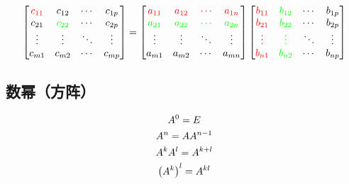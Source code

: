 \documentclass{article}
\begin{document}
\[\begin{bmatrix}
        \textcolor{red}{c_{11}} & c_{12}                    & \cdots & c_{1p} \\
        c_{21}                  & \textcolor{green}{c_{22}} & \cdots & c_{2p} \\
        \vdots                  & \vdots                    & \ddots & \vdots \\
        c_{m1}                  & c_{m2}                    & \cdots & c_{mp} \\
    \end{bmatrix}=
    \begin{bmatrix}
        \textcolor{red}{a_{11}}   & \textcolor{red}{a_{12}}   & \textcolor{red}{\cdots}   & \textcolor{red}{a_{1n}}   \\
        \textcolor{green}{a_{21}} & \textcolor{green}{a_{22}} & \textcolor{green}{\cdots} & \textcolor{green}{a_{2n}} \\
        \vdots                    & \vdots                    & \ddots                    & \vdots                    \\
        a_{m1}                    & a_{m2}                    & \cdots                    & a_{mn}                    \\
    \end{bmatrix}
    \begin{bmatrix}
        \textcolor{red}{b_{11}} & \textcolor{green}{b_{12}} & \cdots & b_{1p} \\
        \textcolor{red}{b_{21}} & \textcolor{green}{b_{22}} & \cdots & b_{2p} \\
        \textcolor{red}{\vdots} & \textcolor{green}{\vdots} & \ddots & \vdots \\
        \textcolor{red}{b_{n1}} & \textcolor{green}{b_{n2}} & \cdots & b_{np} \\
    \end{bmatrix}\]

\subsection{数幂（方阵）}

\[\begin{gathered}
        A^0=E\\
        A^n=AA^{n-1}\\
        A^kA^l=A^{k+l}\\
        \left(A^k\right)^l=A^{kl}
    \end{gathered}\]
\end{document}
